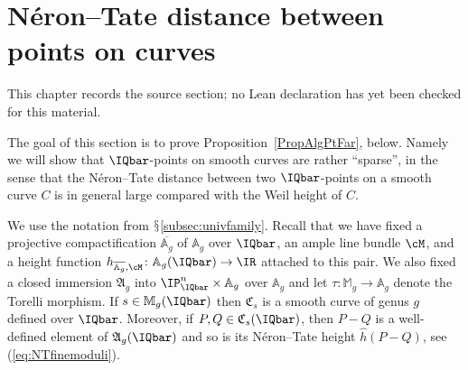 \chapter{N\'{e}ron--Tate distance between points on curves}
\label{uniformity-mordell-lang-curves-chapter-07}

\begin{remark}
\label{uniformity-mordell-lang-curves-chapter-07-source}
This chapter records the source section; no Lean declaration has yet been checked for this material.
\notready
\end{remark}

\label{SectionDistanceCurve}

The goal of this section is to prove Proposition~\ref{PropAlgPtFar}, below.
Namely we will show that $\IQbar$-points on smooth curves are
rather ``sparse'', in the sense that the N\'{e}ron--Tate distance
between two $\IQbar$-points on a smooth curve $C$ is in
general large compared with the Weil height of $C$. %


We use the notation from $\mathsection$\ref{subsec:univfamily}. Recall
that we have fixed a projective compactification
$\overline{\mathbb{A}_g}$ of $\mathbb{A}_g$ over $\IQbar$, an ample
line bundle $\cM$, and a height function
$h_{\overline{\mathbb{A}_g},\cM} \colon
\mathbb{A}_g(\IQbar)\rightarrow \IR$ attached to this pair.
We also fixed a closed immersion $\mathfrak{A}_g$ into
$\IP^n_\IQbar\times \mathbb{A}_g$ over $\mathbb{A}_g$ and
let $\tau\colon \mathbb{M}_g\rightarrow\mathbb{A}_g$ denote the
Torelli morphism.
If $s\in \mathbb{M}_g(\IQbar)$ then $\mathfrak{C}_s$
is a smooth curve of genus $g$ defined over $\IQbar$.
Moreover, if $P,Q\in \mathfrak{C}_s(\IQbar)$, then $P-Q$ is a
well-defined element of $\mathfrak{A}_g(\IQbar)$ and so is its
N\'eron--Tate height  $\hat h(P-Q)$, see (\ref{eq:NTfinemoduli}).

